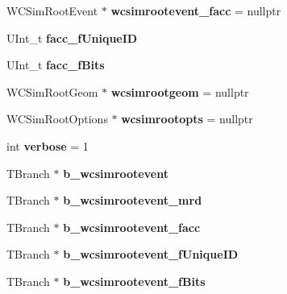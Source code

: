 \begin{DoxyCompactItemize}
\item 
\hypertarget{classwcsimT_a5f0e97c519e0c568630d9c0e006a4851}{
WCSimRootEvent $\ast$ {\bfseries wcsimrootevent\_\-facc} = nullptr}
\label{classwcsimT_a5f0e97c519e0c568630d9c0e006a4851}

\item 
\hypertarget{classwcsimT_ac38dca07015621491de881df5f0e517b}{
UInt\_\-t {\bfseries facc\_\-fUniqueID}}
\label{classwcsimT_ac38dca07015621491de881df5f0e517b}

\item 
\hypertarget{classwcsimT_aa97edda9dcf4901e10cf192074a19026}{
UInt\_\-t {\bfseries facc\_\-fBits}}
\label{classwcsimT_aa97edda9dcf4901e10cf192074a19026}

\item 
\hypertarget{classwcsimT_afa9c52bd9009b784bd99f1027da94c5f}{
WCSimRootGeom $\ast$ {\bfseries wcsimrootgeom} = nullptr}
\label{classwcsimT_afa9c52bd9009b784bd99f1027da94c5f}

\item 
\hypertarget{classwcsimT_a99c3ad47a66bf473c252fbe1c27b33be}{
WCSimRootOptions $\ast$ {\bfseries wcsimrootopts} = nullptr}
\label{classwcsimT_a99c3ad47a66bf473c252fbe1c27b33be}

\item 
\hypertarget{classwcsimT_a962abd92fae523373e395d8238a94f65}{
int {\bfseries verbose} = 1}
\label{classwcsimT_a962abd92fae523373e395d8238a94f65}

\item 
\hypertarget{classwcsimT_a34f268aa1a4bd59c0a36c45da8c16ef1}{
TBranch $\ast$ {\bfseries b\_\-wcsimrootevent}}
\label{classwcsimT_a34f268aa1a4bd59c0a36c45da8c16ef1}

\item 
\hypertarget{classwcsimT_a79e5ff7d30e24c74b718c15c02597814}{
TBranch $\ast$ {\bfseries b\_\-wcsimrootevent\_\-mrd}}
\label{classwcsimT_a79e5ff7d30e24c74b718c15c02597814}

\item 
\hypertarget{classwcsimT_af4806c80e345526543720ac5cacaa9f6}{
TBranch $\ast$ {\bfseries b\_\-wcsimrootevent\_\-facc}}
\label{classwcsimT_af4806c80e345526543720ac5cacaa9f6}

\item 
\hypertarget{classwcsimT_a6766953ba955ffa07d0cc03778a08468}{
TBranch $\ast$ {\bfseries b\_\-wcsimrootevent\_\-fUniqueID}}
\label{classwcsimT_a6766953ba955ffa07d0cc03778a08468}

\item 
\hypertarget{classwcsimT_ac7859021cb4cd3119d20babf73aa0808}{
TBranch $\ast$ {\bfseries b\_\-wcsimrootevent\_\-fBits}}
\label{classwcsimT_ac7859021cb4cd3119d20babf73aa0808}


\end{DoxyCompactItemize}
